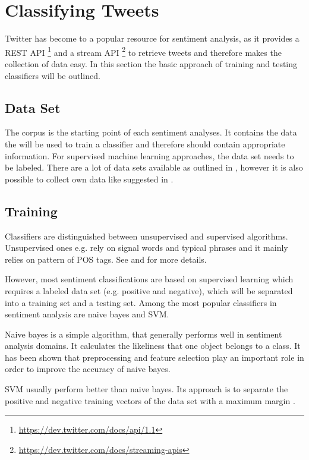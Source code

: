 \documentclass{acm_proc_article-sp}
\begin{document}
\section{Classifying Tweets} \label{classification} Twitter has become to a
popular resource for sentiment analysis, as it provides a REST API
\footnote{\url{https://dev.twitter.com/docs/api/1.1}} and a stream API
\footnote{\url{https://dev.twitter.com/docs/streaming-apis}} to retrieve tweets
and therefore makes the collection of data easy.  In this section the basic
approach of training and testing classifiers will be outlined.


\subsection{Data Set} The corpus is the starting point of each sentiment
analyses. It contains the data the will be used to train a classifier and
therefore should contain appropriate information. For supervised machine
learning approaches, the data set needs to be labeled. There are a lot of data
sets available as outlined in \cite{kouloumpis2011twitter}, however it is also
possible to collect own data like suggested in \cite{pak2010twitter}.


\subsection{Training} Classifiers are distinguished between unsupervised and
supervised algorithms. Unsupervised ones e.g. rely on signal words and typical
phrases and it mainly relies on pattern of POS tags. See
\cite{liu2010sentimentanalysis} and \cite{pang2008opinion} for more details.

However, most sentiment classifications are based on supervised learning which
requires a labeled data set (e.g. positive and negative), which will be
separated into a training set and a testing set. Among the most popular
classifiers in sentiment analysis are naive bayes and SVM. 

Naive bayes is a simple algorithm, that generally performs well in sentiment
analysis domains. It calculates the likeliness that one object belongs to a
class. It has been shown that preprocessing and feature selection play an
important role in order to improve the accuracy of naive bayes.
\cite{ye2009sentiment, ting2011naive}

SVM usually perform better than naive bayes. Its approach is to separate the
positive and negative training vectors of the data set with a maximum margin
\cite{ye2009sentiment}.
\end{document}
